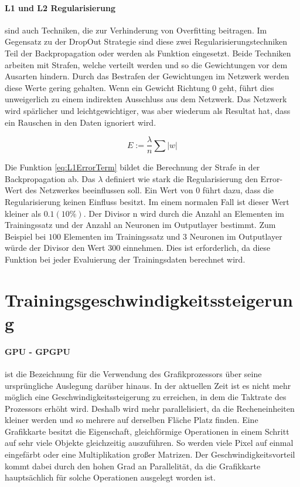 \paragraph{L1 und L2 Regularisierung} sind auch Techniken, die zur Verhinderung von Overfitting beitragen.
Im Gegensatz zu der DropOut Strategie sind diese zwei Regularisierungstechniken Teil der Backpropagation oder werden als Funktion eingesetzt.
Beide Techniken arbeiten mit Strafen, welche verteilt werden und so die Gewichtungen vor dem Ausarten hindern. 
Durch das Bestrafen der Gewichtungen im Netzwerk werden diese Werte gering gehalten. %
Wenn ein Gewicht Richtung $0$ geht, führt dies unweigerlich zu einem indirekten Ausschluss aus dem Netzwerk.
Das Netzwerk wird spärlicher und leichtgewichtiger, was aber wiederum als Resultat hat, dass ein Rauschen in den Daten ignoriert wird.

\begin{equation}
	E := \frac{\lambda}{n} \sum |w|
	\label{eq:L1ErrorTerm}
\end{equation}

Die Funktion \ref{eq:L1ErrorTerm} bildet die Berechnung der Strafe in der Backpropagation ab.
Das $\lambda$ definiert wie stark die Regularisierung den Error-Wert des Netzwerkes beeinflussen soll.
Ein Wert von $0$ führt dazu, dass die Regularisierung keinen Einfluss besitzt. 
Im einem normalen Fall ist dieser Wert kleiner als $0.1 (10\%)$.
Der Divisor n wird durch die Anzahl an Elementen im Trainingssatz und der Anzahl an Neuronen im Outputlayer bestimmt.
Zum Beispiel bei $100$ Elementen im Trainingssatz und $3$ Neuronen im Outputlayer würde der Divisor den Wert $300$ einnehmen.
Dies ist erforderlich, da diese Funktion bei jeder Evaluierung der Trainingsdaten berechnet wird.

\section{Trainingsgeschwindigkeitssteigerung}

\paragraph{GPU - GPGPU} ist die Bezeichnung für die Verwendung des Grafikprozessors über seine ursprüngliche Auslegung darüber hinaus.
In der aktuellen Zeit ist es nicht mehr möglich eine Geschwindigkeitssteigerung zu erreichen, in dem die Taktrate des Prozessors erhöht wird. 
Deshalb wird mehr parallelisiert, da die Recheneinheiten kleiner werden und so mehrere auf derselben Fläche Platz finden. 
Eine Grafikkarte besitzt die Eigenschaft, gleichförmige Operationen in einem Schritt auf sehr viele Objekte gleichzeitig auszuführen. 
So werden viele Pixel auf einmal eingefärbt oder eine Multiplikation großer Matrizen. 
Der Geschwindigkeitsvorteil kommt dabei durch den hohen Grad an Parallelität, da die Grafikkarte hauptsächlich für solche Operationen ausgelegt worden ist.

